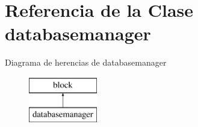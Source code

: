 \hypertarget{classdatabasemanager}{}\section{Referencia de la Clase databasemanager}
\label{classdatabasemanager}
Diagrama de herencias de databasemanager\begin{figure}[H]
\begin{center}
\leavevmode
\includegraphics[height=2.000000cm]{classdatabasemanager}
\end{center}
\end{figure}
